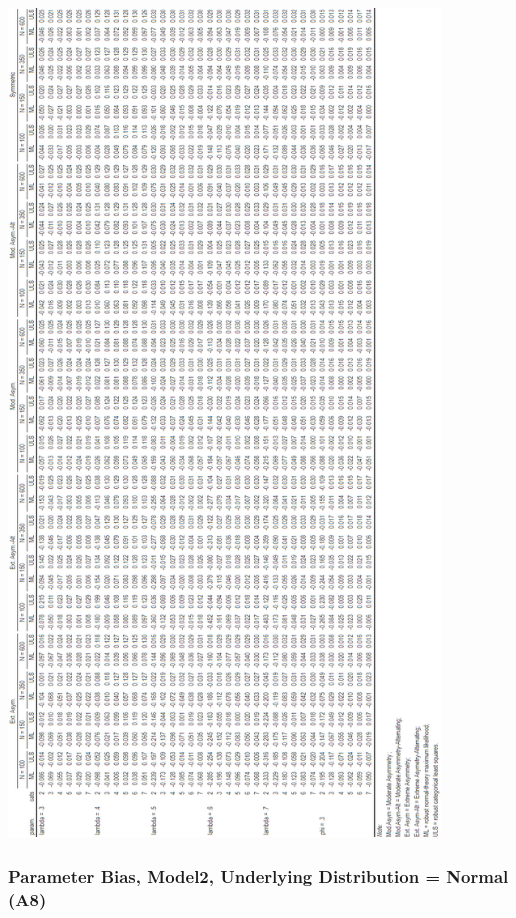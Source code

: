 \documentclass[10,a4paperpaper,]{article}
\begin{document}
\includegraphics[width=325pt]{./figures/tabA7}

\subsubsection{Parameter Bias, Model2, Underlying Distribution = Normal (A8)}
\end{document}
